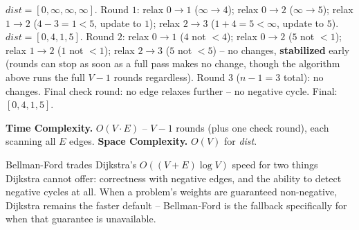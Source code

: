 $\textit{dist}=[0,\infty,\infty,\infty]$. Round $1$: relax $0{\to}1$
($\infty\to4$); relax $0{\to}2$ ($\infty\to5$); relax $1{\to}2$
($4{-}3=1<5$, update to $1$); relax $2{\to}3$ ($1+4=5<\infty$, update
to $5$). $\textit{dist}=[0,4,1,5]$. Round $2$: relax $0{\to}1$ ($4$
not $<4$); relax $0{\to}2$ ($5$ not $<1$); relax $1{\to}2$ ($1$ not
$<1$); relax $2{\to}3$ ($5$ not $<5$) -- no changes,
\textbf{stabilized} early (rounds can stop as soon as a full pass makes
no change, though the algorithm above runs the full $V{-}1$ rounds
regardless). Round $3$ ($n{-}1=3$ total): no changes. Final check
round: no edge relaxes further -- no negative cycle. Final:
$[0,4,1,5]$.

\begin{complexitybox}
\textbf{Time Complexity.} $O(V \cdot E)$ -- $V{-}1$ rounds (plus one
check round), each scanning all $E$ edges.
\textbf{Space Complexity.} $O(V)$ for \textit{dist}.
\end{complexitybox}

\begin{takeawaybox}
Bellman-Ford trades Dijkstra's $O((V+E)\log V)$ speed for two things
Dijkstra cannot offer: correctness with negative edges, and the ability
to detect negative cycles at all. When a problem's weights are
guaranteed non-negative, Dijkstra remains the faster default --
Bellman-Ford is the fallback specifically for when that guarantee is
unavailable.
\end{takeawaybox}
